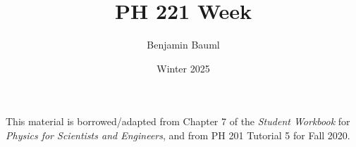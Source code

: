 \documentclass[]{article}
\title{PH 221 Week \Week}
\author{Benjamin Bauml}
\date{Winter 2025}
\newcommand{\FileDepth}{../../..}
\begin{document}
\maketitle
\begin{center}
	This material is borrowed/adapted from Chapter 7 of the \textit{Student Workbook} for \textit{Physics for Scientists and Engineers}, and from PH 201 Tutorial 5 for Fall 2020.
\end{center}



\end{document}
